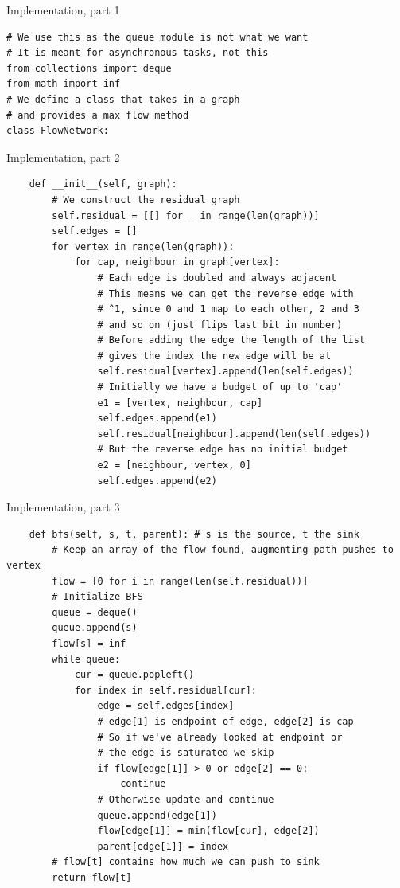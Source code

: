 \documentclass{beamer}
\begin{document}
	\begin{frame}{Implementation, part 1}
		\begin{scriptsize}
\begin{verbatim}
# We use this as the queue module is not what we want
# It is meant for asynchronous tasks, not this
from collections import deque
from math import inf
# We define a class that takes in a graph
# and provides a max flow method
class FlowNetwork:
\end{verbatim}
\end{scriptsize}
\end{frame}
\begin{frame}{Implementation, part 2}
\begin{scriptsize}
\begin{verbatim}
    def __init__(self, graph):
        # We construct the residual graph
        self.residual = [[] for _ in range(len(graph))]
        self.edges = []
        for vertex in range(len(graph)):
            for cap, neighbour in graph[vertex]:
                # Each edge is doubled and always adjacent
                # This means we can get the reverse edge with
                # ^1, since 0 and 1 map to each other, 2 and 3
                # and so on (just flips last bit in number)
                # Before adding the edge the length of the list
                # gives the index the new edge will be at
                self.residual[vertex].append(len(self.edges))
                # Initially we have a budget of up to 'cap'
                e1 = [vertex, neighbour, cap]
                self.edges.append(e1)
                self.residual[neighbour].append(len(self.edges))
                # But the reverse edge has no initial budget
                e2 = [neighbour, vertex, 0]
                self.edges.append(e2)
\end{verbatim}
\end{scriptsize}
\end{frame}
\begin{frame}{Implementation, part 3}
\begin{scriptsize}
\begin{verbatim}
    def bfs(self, s, t, parent): # s is the source, t the sink
        # Keep an array of the flow found, augmenting path pushes to vertex
        flow = [0 for i in range(len(self.residual))]
        # Initialize BFS
        queue = deque()
        queue.append(s)
        flow[s] = inf
        while queue:
            cur = queue.popleft()
            for index in self.residual[cur]:
                edge = self.edges[index]
                # edge[1] is endpoint of edge, edge[2] is cap
                # So if we've already looked at endpoint or
                # the edge is saturated we skip
                if flow[edge[1]] > 0 or edge[2] == 0:
                    continue
                # Otherwise update and continue
                queue.append(edge[1])
                flow[edge[1]] = min(flow[cur], edge[2])
                parent[edge[1]] = index
        # flow[t] contains how much we can push to sink
        return flow[t]
\end{verbatim}
\end{scriptsize}
\end{frame}
\end{document}
